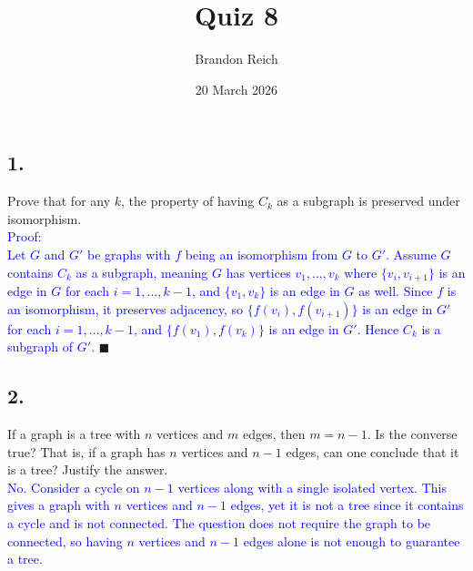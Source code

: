\documentclass{article}
\title{Quiz 8}
\author{Brandon Reich}
\date{20 March 2026}
\begin{document}
\maketitle

\subsection*{1.}
Prove that for any $k$, the property of having $C_k$ as a subgraph is preserved under isomorphism. \\[1em]
\textcolor{blue}{Proof:} \\[0.5em]
\textcolor{blue}{Let $G$ and $G'$ be graphs with $f$ being an isomorphism from $G$ to $G'$. Assume $G$ contains $C_k$ as a subgraph, meaning $G$ has vertices $v_1, \ldots, v_k$ where $\{v_i, v_{i+1}\}$ is an edge in $G$ for each $i = 1, \ldots, k - 1$, and $\{v_1, v_k\}$ is an edge in $G$ as well. Since $f$ is an isomorphism, it preserves adjacency, so $\{f(v_i), f(v_{i+1})\}$ is an edge in $G'$ for each $i = 1, \ldots, k - 1$, and $\{f(v_1), f(v_k)\}$ is an edge in $G'$. Hence $C_k$ is a subgraph of $G'$.} $\blacksquare$

\subsection*{2.}
If a graph is a tree with $n$ vertices and $m$ edges, then $m = n - 1$. Is the converse true? That is, if a graph has $n$ vertices and $n - 1$ edges, can one conclude that it is a tree? Justify the answer. \\[1em]
\textcolor{blue}{No. Consider a cycle on $n - 1$ vertices along with a single isolated vertex. This gives a graph with $n$ vertices and $n - 1$ edges, yet it is not a tree since it contains a cycle and is not connected. The question does not require the graph to be connected, so having $n$ vertices and $n - 1$ edges alone is not enough to guarantee a tree.}
\end{document}
